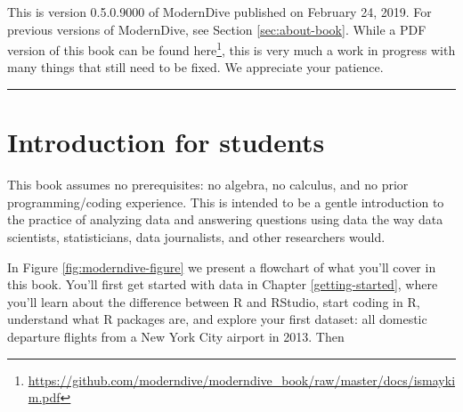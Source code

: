\documentclass[12pt, krantz2,]{krantz}
\renewcommand{\href}[2]{#2\footnote{\url{#1}}}
\begin{document}
This is version 0.5.0.9000 of ModernDive published on February 24, 2019. For previous versions of ModernDive, see Section \ref{sec:about-book}. While a PDF version of this book can be found \href{https://github.com/moderndive/moderndive_book/raw/master/docs/ismaykim.pdf}{here}, this is very much a work in progress with many things that still need to be fixed. We appreciate your patience.

\begin{center}\rule{0.5\linewidth}{\linethickness}\end{center}

\hypertarget{sec:intro-for-students}{%
\section{Introduction for students}\label{sec:intro-for-students}}

This book assumes no prerequisites: no algebra, no calculus, and no prior programming/coding experience. This is intended to be a gentle introduction to the practice of analyzing data and answering questions using data the way data scientists, statisticians, data journalists, and other researchers would.

In Figure \ref{fig:moderndive-figure} we present a flowchart of what you'll cover in this book. You'll first get started with data in Chapter \ref{getting-started}, where you'll learn about the difference between R and RStudio, start coding in R, understand what R packages are, and explore your first dataset: all domestic departure flights from a New York City airport in 2013. Then
\end{document}
